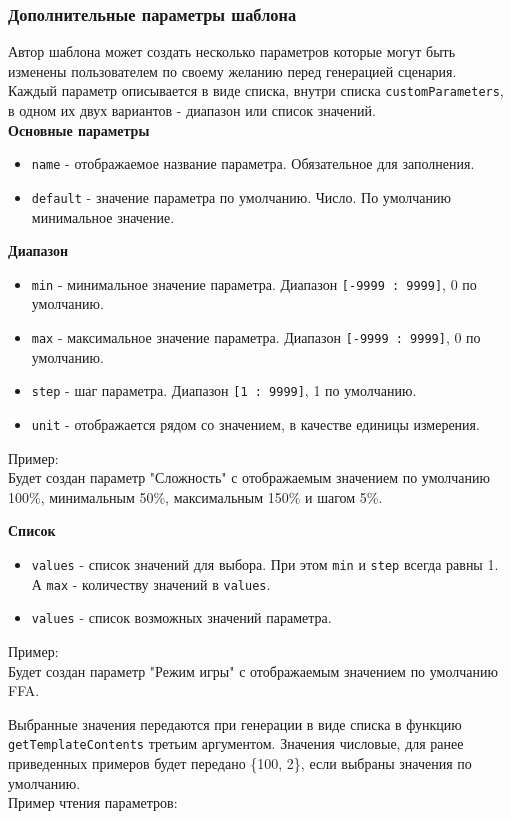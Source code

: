 \subsubsection{Дополнительные параметры шаблона}
\label{customParameters}
Автор шаблона может создать несколько параметров которые могут быть изменены пользователем по своему желанию перед генерацией сценария.\\
Каждый параметр описывается в виде списка, внутри списка \texttt{customParameters}, в одном их двух вариантов - диапазон или список значений.\\
\textbf{Основные параметры}
\begin{itemize}
\item \texttt{name} - отображаемое название параметра. Обязательное для заполнения.
\item \texttt{default} - значение параметра по умолчанию. Число. По умолчанию минимальное значение.
\end{itemize}
\textbf{Диапазон}
\begin{itemize}
\item \texttt{min} - минимальное значение параметра. Диапазон \texttt{[-9999 : 9999]}, 0 по умолчанию.
\item \texttt{max} - максимальное значение параметра. Диапазон \texttt{[-9999 : 9999]}, 0 по умолчанию.
\item \texttt{step} - шаг параметра. Диапазон \texttt{[1 : 9999]}, 1 по умолчанию.
\item \texttt{unit} - отображается рядом со значением, в качестве единицы измерения.
\end{itemize}
Пример:\\
Будет создан параметр "Сложность" с отображаемым значением по умолчанию 100\%, минимальным 50\%, максимальным 150\% и шагом 5\%.
\begin{figure}[H]

\end{figure}
\textbf{Список}
\begin{itemize}
\item \texttt{values} - список значений для выбора.
При этом \texttt{min} и \texttt{step} всегда равны 1. А \texttt{max} - количеству значений в \texttt{values}.
\item \texttt{values} - список возможных значений параметра.
\end{itemize}
Пример:\\
Будет создан параметр "Режим игры" с отображаемым значением по умолчанию FFA.
\begin{figure}[H]

\end{figure}
Выбранные значения передаются при генерации в виде списка в функцию \texttt{getTemplateContents} 
 третьим аргументом. Значения числовые, для ранее приведенных примеров будет передано \{100, 2\}, если выбраны значения по умолчанию.\\
Пример чтения параметров:
\begin{figure}[H]

\end{figure}
